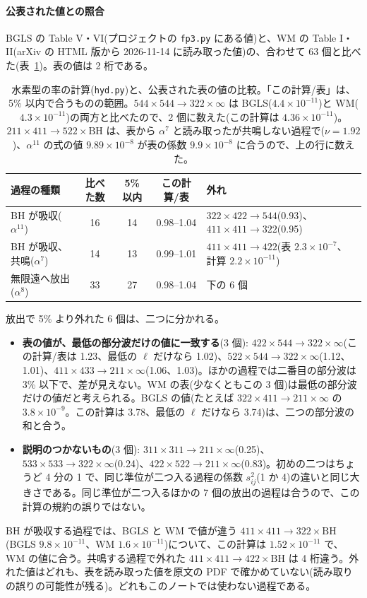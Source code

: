 \paragraph{公表された値との照合}
BGLS の Table V・VI(プロジェクトの \texttt{fp3.py} にある値)と、WM の Table I・II(arXiv の HTML 版から 2026-11-14 に読み取った値)の、合わせて 63 個と比べた(表~\ref{tab:e21calib})。表の値は 2 桁である。
\begin{table}[H]
\centering\footnotesize
\begin{tabular}{lcccl}
\toprule
過程の種類 & 比べた数 & 5\% 以内 & この計算/表 & 外れ\\
\midrule
BH が吸収($\alpha^{11}$) & 16 & 14 & 0.98--1.04 & $322\times422\to544$(0.93)、$411\times411\to322$(0.95)\\
BH が吸収、共鳴($\alpha^{7}$) & 14 & 13 & 0.99--1.01 & $411\times411\to422$(表 $2.3\times10^{-7}$、計算 $2.2\times10^{-11}$)\\
無限遠へ放出($\alpha^{8}$) & 33 & 27 & 0.98--1.04 & 下の 6 個\\
\bottomrule
\end{tabular}
\caption{水素型の率の計算(\texttt{hyd.py})と、公表された表の値の比較。「この計算/表」は、5\% 以内で合うものの範囲。$544\times544\to322\times\infty$ は BGLS($4.4\times10^{-11}$)と WM($4.3\times10^{-11}$)の両方と比べたので、2 個に数えた(この計算は $4.36\times10^{-11}$)。$211\times411\to522\times\mathrm{BH}$ は、表から $\alpha^7$ と読み取ったが共鳴しない過程で($\nu=1.92$)、$\alpha^{11}$ の式の値 $9.89\times10^{-8}$ が表の係数 $9.9\times10^{-8}$ に合うので、上の行に数えた。}
\label{tab:e21calib}
\end{table}
放出で 5\% より外れた 6 個は、二つに分かれる。
\begin{itemize}
\item \textbf{表の値が、最低の部分波だけの値に一致する}(3 個): $422\times544\to322\times\infty$(この計算/表は 1.23、最低の $\ell$ だけなら 1.02)、$522\times544\to322\times\infty$(1.12、1.01)、$411\times433\to211\times\infty$(1.06、1.03)。ほかの過程では二番目の部分波は 3\% 以下で、差が見えない。WM の表(少なくともこの 3 個)は最低の部分波だけの値だと考えられる。BGLS の値(たとえば $322\times411\to211\times\infty$ の $3.8\times10^{-9}$。この計算は 3.78、最低の $\ell$ だけなら 3.74)は、二つの部分波の和と合う。
\item \textbf{説明のつかないもの}(3 個): $311\times311\to211\times\infty$(0.25)、$533\times533\to322\times\infty$(0.24)、$422\times522\to211\times\infty$(0.83)。初めの二つはちょうど 4 分の 1 で、同じ準位が二つ入る過程の係数 $s_{ij}^2$(1 か 4)の違いと同じ大きさである。同じ準位が二つ入るほかの 7 個の放出の過程は合うので、この計算の規約の誤りではない。
\end{itemize}
BH が吸収する過程では、BGLS と WM で値が違う $411\times411\to322\times\mathrm{BH}$(BGLS $9.8\times10^{-11}$、WM $1.6\times10^{-11}$)について、この計算は $1.52\times10^{-11}$ で、WM の値に合う。共鳴する過程で外れた $411\times411\to422\times\mathrm{BH}$ は 4 桁違う。外れた値はどれも、表を読み取った値を原文の PDF で確かめていない(読み取りの誤りの可能性が残る)。どれもこのノートでは使わない過程である。

